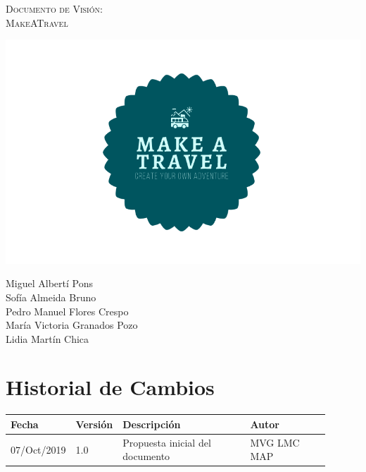 \documentclass[11pt]{article}
\begin{document}
\begin{titlepage}
\centering
\vspace{4.5cm}
{\scshape\LARGE Documento de Visión:\\MakeATravel \par}
\vspace{1.5cm}

\includegraphics[width=16cm]{Logo}

\vspace{3cm}
{\scshape\large \par}
\vspace{1cm}

{Miguel Albertí Pons\\
Sofía Almeida Bruno\\
Pedro Manuel Flores Crespo\\
María Victoria Granados Pozo\\
Lidia Martín Chica
\par}

\end{titlepage}
\newpage

\section*{Historial de Cambios}
\begin{table}[H]
  \centering
  \begin{tabular}{p{0.15\linewidth}p{0.1\linewidth}p{0.4\linewidth}p{0.25\linewidth}}
    \toprule
    \textbf{Fecha} & \textbf{Versión} & \textbf{Descripción} & \textbf{Autor}\\
    \midrule
    07/Oct/2019 & 1.0 & Propuesta inicial del documento & MVG LMC MAP\\
    \bottomrule
  \end{tabular}
\end{table}
\newpage
\end{document}
